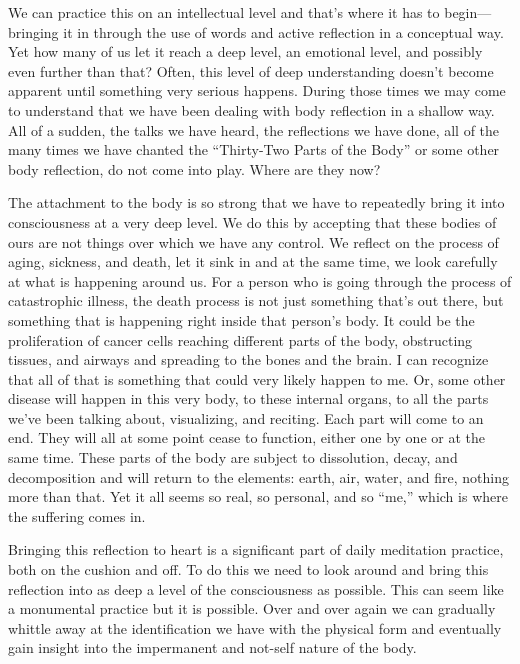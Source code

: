 We can practice this on an intellectual level and that's where it has 
to begin---bringing it in through the use of words and active 
reflection in a conceptual way. Yet how many of us let it reach a deep 
level, an emotional level, and possibly even further than that? Often, 
this level of deep understanding doesn't become apparent until 
something very serious happens. During those times we may come to 
understand that we have been dealing with body reflection in a shallow 
way. All of a sudden, the talks we have heard, the reflections we have 
done, all of the many times we have chanted the ``Thirty-Two Parts of 
the Body'' or some other body reflection, do not come into play. Where 
are they now?

The attachment to the body is so strong that we have to repeatedly 
bring it into consciousness at a very deep level. We do this by 
accepting that these bodies of ours are not things over which we have 
any control. We reflect on the process of aging, sickness, and death, 
let it sink in and at the same time, we look carefully at what is 
happening around us. For a person who is going through the process of 
catastrophic illness, the death process is not just something that's 
out there, but something that is happening right inside that person's 
body. It could be the proliferation of cancer cells reaching different 
parts of the body, obstructing tissues, and airways and spreading to 
the bones and the brain. I can recognize that all of that is something 
that could very likely happen to me. Or, some other disease will happen 
in this very body, to these internal organs, to all the parts we've 
been talking about, visualizing, and reciting. Each part will come to 
an end. They will all at some point cease to function, either one by 
one or at the same time. These parts of the body are subject to 
dissolution, decay, and decomposition and will return to the elements: 
earth, air, water, and fire, nothing more than that. Yet it all seems 
so real, so personal, and so ``me,'' which is where the suffering comes 
in.

Bringing this reflection to heart is a significant part of daily 
meditation practice, both on the cushion and off. To do this we need to 
look around and bring this reflection into as deep a level of the 
consciousness as possible. This can seem like a monumental practice but 
it is possible. Over and over again we can gradually whittle away at 
the identification we have with the physical form and eventually gain 
insight into the impermanent and not-self nature of the body.

